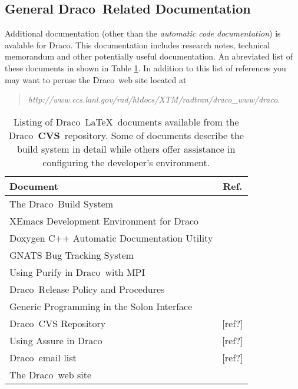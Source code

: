 \documentclass[10pt]{nmemo}
\newcommand{\draco}{{\normalfont\sffamily Draco}}
\newcommand{\cvs}{{\normalfont\bfseries CVS}}
\begin{document}
\subsection{General \draco\ Related Documentation}

Additional documentation (other than the \emph{automatic code
documentation}) is avalable for \draco.  This documentation includes
research notes, technical memorandum and other potentially useful
documentation.  An abreviated list of these documents in shown in
Table \ref{tab:draco_docs}.  In addition to this list of references
you may want to peruse the \draco\ web site located at

\begin{quote}
\emph{http://www.ccs.lanl.gov/rad/htdocs/XTM/radtran/draco\_www/draco}.
\end{quote}

\begin{table}
  \caption{Listing of \draco\ \LaTeX\ documents available from the
    \draco\ \cvs\ repository.  Some of documents describe the build
    system in detail while others offer assistance in configuring the
    developer's environment.}
  \label{tab:draco_docs}
  \begin{center}
    \begin{tabular}{lc} \hline\hline
      \multicolumn{1}{l}{Document} & \multicolumn{1}{c}{Ref.} \\ \hline
      The \draco\ Build System               & ~\cite{draco-build} \\
      XEmacs Development Environment for \draco & ~\cite{xtm:9909} \\
      Doxygen C++ Automatic Documentation Utility & ~\cite{doxygen} \\
      GNATS Bug Tracking System              & ~\cite{draco-gnats} \\
      Using Purify in \draco\ with MPI       & ~\cite{draco-purify} \\
      \draco\ Release Policy and Procedures  & ~\cite{xtm:9936}    \\
      Generic Programming in the Solon Interface & ~\cite{ro98} \\
      \draco\ CVS Repository                 & [ref?] \\
      Using Assure in \draco                 & [ref?] \\
      \draco\ email list                     & [ref?] \\
      The \draco\ web site                   &  ~\cite{draco-web-site} \\
      \hline\hline
    \end{tabular}
  \end{center}
\end{table}
\end{document}
